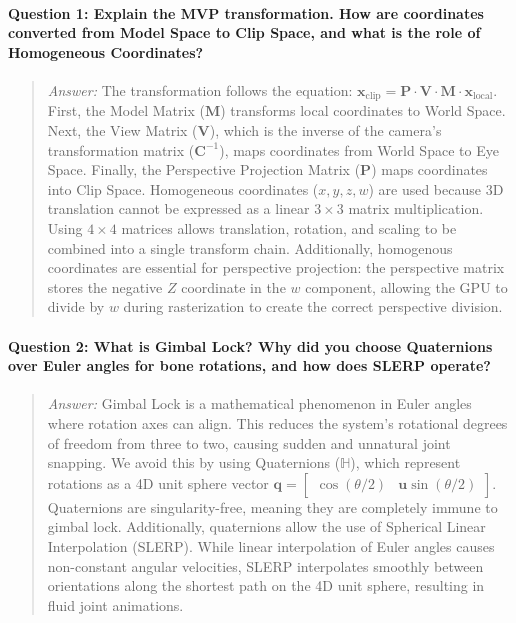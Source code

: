 \documentclass[11pt,a4paper,oneside]{article}
\begin{document}
\paragraph{Question 1: Explain the MVP transformation. How are coordinates converted from Model Space to Clip Space, and what is the role of Homogeneous Coordinates?}
\begin{quote}
    \emph{Answer:} The transformation follows the equation: $\mathbf{x}_{\text{clip}} = \mathbf{P} \cdot \mathbf{V} \cdot \mathbf{M} \cdot \mathbf{x}_{\text{local}}$.
    First, the Model Matrix ($\mathbf{M}$) transforms local coordinates to World Space. Next, the View Matrix ($\mathbf{V}$), which is the inverse of the camera's transformation matrix ($\mathbf{C}^{-1}$), maps coordinates from World Space to Eye Space. Finally, the Perspective Projection Matrix ($\mathbf{P}$) maps coordinates into Clip Space. 
    Homogeneous coordinates ($x, y, z, w$) are used because 3D translation cannot be expressed as a linear $3\times3$ matrix multiplication. Using $4\times4$ matrices allows translation, rotation, and scaling to be combined into a single transform chain. Additionally, homogenous coordinates are essential for perspective projection: the perspective matrix stores the negative $Z$ coordinate in the $w$ component, allowing the GPU to divide by $w$ during rasterization to create the correct perspective division.
\end{quote}

\paragraph{Question 2: What is Gimbal Lock? Why did you choose Quaternions over Euler angles for bone rotations, and how does SLERP operate?}
\begin{quote}
    \emph{Answer:} Gimbal Lock is a mathematical phenomenon in Euler angles where rotation axes can align. This reduces the system's rotational degrees of freedom from three to two, causing sudden and unnatural joint snapping.
    We avoid this by using Quaternions ($\mathbb{H}$), which represent rotations as a 4D unit sphere vector $\mathbf{q} = \begin{bmatrix} \cos(\theta/2) & \mathbf{u}\sin(\theta/2) \end{bmatrix}$. Quaternions are singularity-free, meaning they are completely immune to gimbal lock. 
    Additionally, quaternions allow the use of Spherical Linear Interpolation (SLERP). While linear interpolation of Euler angles causes non-constant angular velocities, SLERP interpolates smoothly between orientations along the shortest path on the 4D unit sphere, resulting in fluid joint animations.
\end{quote}
\end{document}
